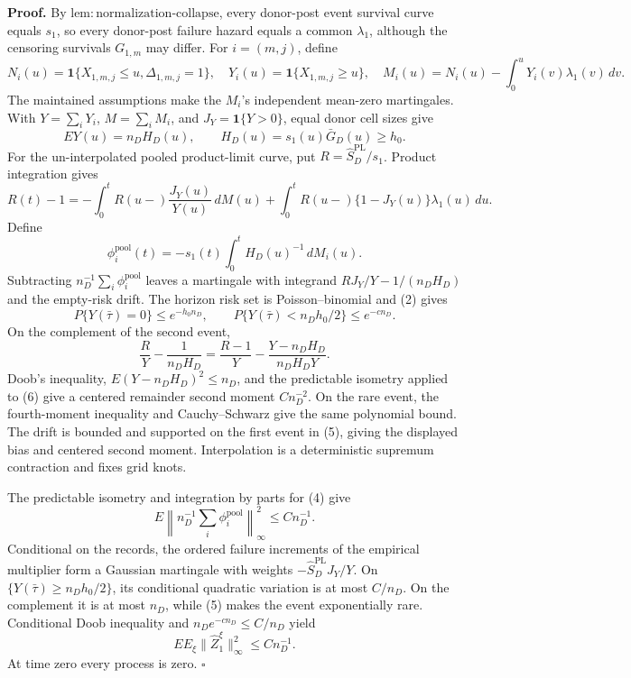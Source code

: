 \textbf{Proof.}
By \(\mathrm{lem:normalization\mbox{-}collapse}\), every donor-post event survival curve equals \(s_1\), so every donor-post failure hazard equals a common \(\lambda_1\), although the censoring survivals \(G_{1,m}\) may differ. For \(i=(m,j)\), define
\[
 N_i(u)=\mathbf1\{X_{1,m,j}\le u,\Delta_{1,m,j}=1\},
 \quad Y_i(u)=\mathbf1\{X_{1,m,j}\ge u\},
 \quad M_i(u)=N_i(u)-\int_0^uY_i(v)\lambda_1(v)\,dv.       \tag{1}
\]
The maintained assumptions make the \(M_i\)'s independent mean-zero martingales. With \(Y=\sum_iY_i\), \(M=\sum_iM_i\), and \(J_Y=\mathbf1\{Y>0\}\), equal donor cell sizes give
\[
 EY(u)=n_DH_D(u),\qquad H_D(u)=s_1(u)\bar G_D(u)\ge h_0.   \tag{2}
\]
For the un-interpolated pooled product-limit curve, put \(R=\widehat S_D^{\mathrm{PL}}/s_1\). Product integration gives
\[
 R(t)-1=-\int_0^tR(u-)\frac{J_Y(u)}{Y(u)}\,dM(u)
 +\int_0^tR(u-)\{1-J_Y(u)\}\lambda_1(u)\,du.              \tag{3}
\]
Define
\[
 \phi_i^{\mathrm{pool}}(t)
 =-s_1(t)\int_0^tH_D(u)^{-1}\,dM_i(u).                    \tag{4}
\]
Subtracting \(n_D^{-1}\sum_i\phi_i^{\mathrm{pool}}\) leaves a martingale with integrand \(R J_Y/Y-1/(n_DH_D)\) and the empty-risk drift. The horizon risk set is Poisson--binomial and (2) gives
\[
 P\{Y(\bar\tau)=0\}\le e^{-h_0n_D},
 \qquad P\{Y(\bar\tau)<n_Dh_0/2\}\le e^{-cn_D}.          \tag{5}
\]
On the complement of the second event,
\[
 \frac{R}{Y}-\frac1{n_DH_D}
 =\frac{R-1}{Y}-\frac{Y-n_DH_D}{n_DH_DY}.                  \tag{6}
\]
Doob's inequality, \(E(Y-n_DH_D)^2\le n_D\), and the predictable isometry applied to (6) give a centered remainder second moment \(Cn_D^{-2}\). On the rare event, the fourth-moment inequality and Cauchy--Schwarz give the same polynomial bound. The drift is bounded and supported on the first event in (5), giving the displayed bias and centered second moment. Interpolation is a deterministic supremum contraction and fixes grid knots.

The predictable isometry and integration by parts for (4) give
\[
 E\left\|n_D^{-1}\sum_i\phi_i^{\mathrm{pool}}\right\|_\infty^2
 \le Cn_D^{-1}.                                           \tag{7}
\]
Conditional on the records, the ordered failure increments of the empirical multiplier form a Gaussian martingale with weights \(-\widehat S_D^{\mathrm{PL}}J_Y/Y\). On \(\{Y(\bar\tau)\ge n_Dh_0/2\}\), its conditional quadratic variation is at most \(C/n_D\). On the complement it is at most \(n_D\), while (5) makes the event exponentially rare. Conditional Doob inequality and \(n_De^{-cn_D}\le C/n_D\) yield
\[
 E E_\xi\|\widehat Z_1^\xi\|_\infty^2\le Cn_D^{-1}.      \tag{8}
\]
At time zero every process is zero. \(\square\)